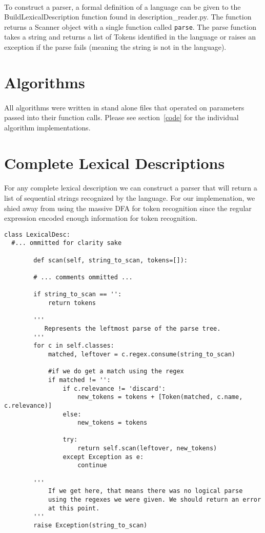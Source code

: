 \documentclass{article}
\begin{document}
\paragraph{} To construct a parser, a formal definition of a language can be
given to the BuildLexicalDescription function found in
description\_reader.py. The function returns a Scanner object with a
single function called \verb|parse|. The parse function takes a string
and returns a list of Tokens identified in the language or raises an
exception if the parse fails (meaning the string is not in the language).

\section{Algorithms}
\paragraph{}All algorithms were written in stand alone files that
operated on parameters passed into their function calls. Please see
section~\ref{code} for the individual algorithm implementations.

\section{Complete Lexical Descriptions}
\paragraph{}For any complete lexical description we can construct a 
parser that will return a list of sequential strings recognized by the
language. For our implemenation, we shied away from using the massive
DFA for token recognition since the regular expression encoded enough
information for token recognition. 

\begin{verbatim}
class LexicalDesc:
  #... ommitted for clarity sake

        def scan(self, string_to_scan, tokens=[]):

        # ... comments ommitted ...

        if string_to_scan == '':
            return tokens

        '''
           Represents the leftmost parse of the parse tree.
        '''
        for c in self.classes:
            matched, leftover = c.regex.consume(string_to_scan)

            #if we do get a match using the regex
            if matched != '':
                if c.relevance != 'discard':
                    new_tokens = tokens + [Token(matched, c.name, c.relevance)]
                else:
                    new_tokens = tokens

                try:
                    return self.scan(leftover, new_tokens)
                except Exception as e:
                    continue

        ''' 
            If we get here, that means there was no logical parse
            using the regexes we were given. We should return an error
            at this point. 
        '''
        raise Exception(string_to_scan)
\end{verbatim}
\end{document}
